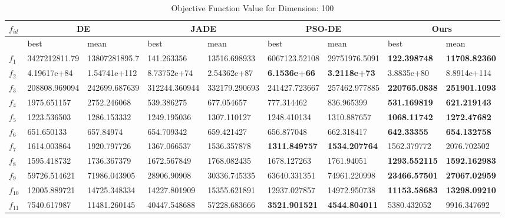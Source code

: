 \begin{table*}[t]
\centering
\caption{Objective Function Value for Dimension: 100}
\vspace{-1mm}
 \begin{tabular}{|p{0.8cm}|p{1.6cm}|p{1.6cm}|p{1.6cm}|p{1.6cm}|p{1.6cm}|p{1.6cm}|p{1.6cm}|p{1.6cm}|} 
\hline
$f_{id}$ & \multicolumn{2}{c|}{DE} & \multicolumn{2}{c|}{JADE} & \multicolumn{2}{c|}{PSO-DE} & \multicolumn{2}{c|}{Ours} \\
\hline
    & best & mean & best & mean & best & mean & best & mean \\ [0.5ex] 
\hline
$f_{1}$  & 3427212811.79 & 13807281895.7 & 141.263356 & 13516.698933 & 6067123.52108 & 29751976.5091 & \textbf{122.398748} & \textbf{11708.82360} \\ 
$f_{2}$  & 4.19617e+84 & 1.54741e+112 & 8.73752e+74 & 2.54362e+87 & \textbf{6.1536e+66} & \textbf{3.2118e+73} & 3.8835e+80 & 8.8914e+114 \\ 
$f_{3}$  & 208808.969094 & 242699.687639 & 312244.360944 & 332179.290693 & 241427.723667 & 257462.977885 & \textbf{220765.0838} & \textbf{251901.1093} \\ 
$f_{4}$  & 1975.651157 & 2752.246068 & 539.386275 & 677.054657 & 777.314462 & 836.965399 & \textbf{531.169819} & \textbf{621.219143} \\ 
$f_{5}$  & 1223.536503 & 1286.153332 & 1249.195036 & 1307.110127 & 1248.410134 & 1310.887657 & \textbf{1068.11742} & \textbf{1272.47682} \\ 
$f_{6}$  & 651.650133 & 657.84974 & 654.709342 & 659.421427 & 656.877048 & 662.318417 & \textbf{642.33355} & \textbf{654.132758} \\ 
$f_{7}$  & 1614.003864 & 1920.797726 & 1367.066537 & 1536.357878 & \textbf{1311.849757} & \textbf{1534.207764} & 1562.379772 & 2076.702502 \\ 
$f_{8}$  & 1595.418732 & 1736.367379 & 1672.567849 & 1768.082435 & 1678.127263 & 1761.94051 & \textbf{1293.552115} & \textbf{1592.162983} \\ 
$f_{9}$  & 59726.514621 & 71986.043905 & 28906.90908 & 30336.745335 & 63640.331351 & 74961.220998 & \textbf{23466.57501} & \textbf{27067.02959} \\ 
$f_{10}$  & 12005.889721 & 14725.348334 & 14227.801909 & 15355.621891 & 12937.027857 & 14972.950738 & \textbf{11153.58683} & \textbf{13298.09210} \\ 
$f_{11}$  & 7540.617987 & 11481.260145 & 40447.548688 & 57228.683666 & \textbf{3521.901521} & \textbf{4544.804011} & 5380.432052 & 9916.347692 \\ 

\end{tabular}
\end{table*}

